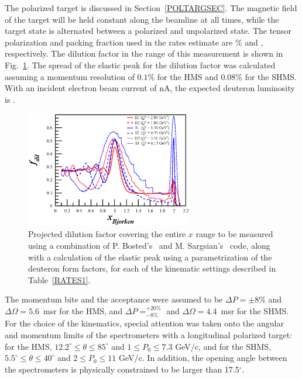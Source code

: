 The polarized \TARGET target is discussed in Section~\ref{POLTARGSEC}.  The magnetic field of the target will be held constant along the beamline at all times, while the target state is alternated between a polarized and unpolarized state.
The tensor polarization and packing fraction used in the rates estimate are \PZZ\% and \PF, respectively. 
The dilution factor in the range of this measurement is shown in Fig.~\ref{fdil_plot}. The spread of the elastic peak for the dilution factor was calculated assuming a momentum resolution of $0.1\%$ for the HMS and $0.08\%$ for the SHMS.
With an incident electron beam current of \CURRENT nA, the expected deuteron luminosity is \LUMI.



\begin{figure}
\begin{center}
\includegraphics[width=0.65\textwidth]{figs/Pzz_30_fdil_all.eps} 
\caption{\label{fdil_plot}Projected dilution factor covering the entire $x$ range to be measured using a combination of P. Bosted's~\cite{Bosted:2012qc} and M. Sargsian's~\cite{misak-convo} code, along with a calculation of the elastic peak using a parametrization of the deuteron form factors, for each of the kinematic settings described in Table~\ref{RATES1}.}
\end{center}
\end{figure}


The momentum bite and the acceptance were assumed to be $\Delta P = \pm 8\%$ and $\Delta\Omega = 5.6$~msr for the HMS, and $\Delta P= ^{+20\%}_{-8\%}$ 
and $\Delta\Omega =4.4$~msr for the SHMS. 
%
For the choice of the kinematics,
special attention was taken onto the angular and momentum limits of the spectrometers with a longitudinal polarized target: for the
HMS, $12.2^{\circ} \le \theta \le 85^{\circ}$ and $1 \le P_0 \le 7.3$ GeV/c, and for the SHMS,
$5.5^{\circ} \le \theta \le 40^{\circ}$ and $2 \le P_0 \le 11$ GeV/c. In addition, the
opening angle between the spectrometers is physically constrained to be larger than 17.5$^{\circ}$.

